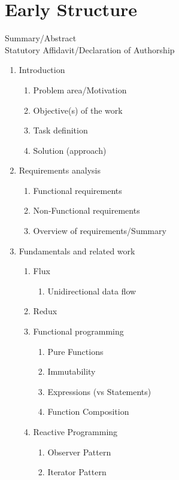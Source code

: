\section{Early Structure}
\label{sec:early-structure}

\quad Summary/Abstract
\\
\quad Statutory Affidavit/Declaration of Authorship
\begin{enumerate}
    \item Introduction
    \begin{enumerate}
        \item Problem area/Motivation
        \item Objective(s) of the work
        \item Task definition
        \item Solution (approach)
    \end{enumerate}
    \item Requirements analysis
    \begin{enumerate}
        \item Functional requirements
        \item Non-Functional requirements
        \item Overview of requirements/Summary
    \end{enumerate}
    \item Fundamentals and related work
    \begin{enumerate}
        \item Flux
        \begin{enumerate}
            \item Unidirectional data flow
        \end{enumerate}
        \item Redux
        \item Functional programming
        \begin{enumerate}
            \item Pure Functions
            \item Immutability
            \item Expressions (vs Statements)
            \item Function Composition
        \end{enumerate}
        \item Reactive Programming
        \begin{enumerate}
            \item Observer Pattern
            \item Iterator Pattern

\end{enumerate}
\end{enumerate}
\end{enumerate}
